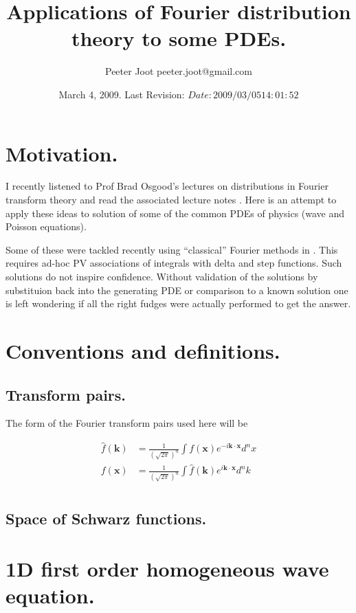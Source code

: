 \documentclass{article}
\title{ Applications of Fourier distribution theory to some PDEs. }
\author{Peeter Joot \quad peeter.joot@gmail.com }
\date{ March 4, 2009.  Last Revision: $Date: 2009/03/05 14:01:52 $ }
\begin{document}
\maketitle{}
\tableofcontents

\section{ Motivation. }

I recently listened to Prof Brad Osgood's lectures on distributions in Fourier
transform theory and read the associated lecture notes
\cite{osgoodFourier}.  Here is an attempt to apply these ideas to solution
of some of the common PDEs of physics (wave and Poisson equations).

Some of these were tackled recently using ``classical'' Fourier methods
in \cite{PJpoisson}. 
This requires ad-hoc PV associations of integrals with delta and step
functions.  Such solutions do not inspire confidence.  Without
validation of the solutions by substituion back into the generating PDE
or comparison to a known solution one is left wondering
if all the right fudges were actually performed to get the answer.

\section{ Conventions and definitions. }

\subsection{ Transform pairs. }

The form of the Fourier transform pairs used here will be

\begin{align*}
\hat{f}(\mathbf{k}) &= \frac{1}{(\sqrt{2\pi})^n} \int f(\mathbf{x}) e^{-i \mathbf{k} \cdot \mathbf{x} } d^n x \\
{f}(\mathbf{x}) &= \frac{1}{(\sqrt{2\pi})^n} \int \hat{f}(\mathbf{k}) e^{i \mathbf{k} \cdot \mathbf{x} } d^n k \\
\end{align*}

\subsection{ Space of Schwarz functions. }

\section{ 1D first order homogeneous wave equation. }
\end{document}
